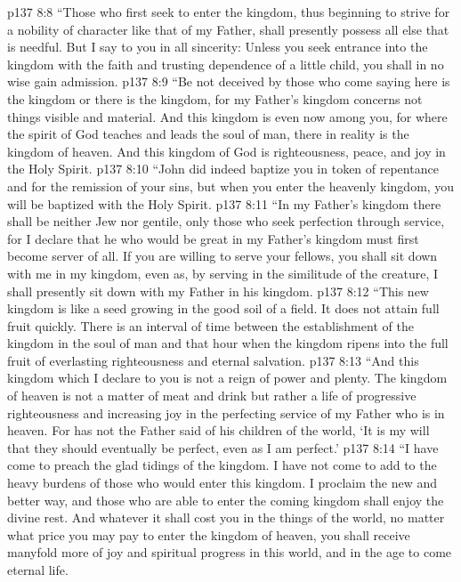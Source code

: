 \vs p137 8:8 \textcolor{ubdarkred}{“Those who first seek to enter the kingdom, thus beginning to strive for a nobility of character like that of my Father, shall presently possess all else that is needful. But I say to you in all sincerity: Unless you seek entrance into the kingdom with the faith and trusting dependence of a little child, you shall in no wise gain admission.}
\vs p137 8:9 \textcolor{ubdarkred}{“Be not deceived by those who come saying here is the kingdom or there is the kingdom, for my Father’s kingdom concerns not things visible and material. And this kingdom is even now among you, for where the spirit of God teaches and leads the soul of man, there in reality is the kingdom of heaven. And this kingdom of God is righteousness, peace, and joy in the Holy Spirit.}
\vs p137 8:10 \textcolor{ubdarkred}{“John did indeed baptize you in token of repentance and for the remission of your sins, but when you enter the heavenly kingdom, you will be baptized with the Holy Spirit.}
\vs p137 8:11 \textcolor{ubdarkred}{“In my Father’s kingdom there shall be neither Jew nor gentile, only those who seek perfection through service, for I declare that he who would be great in my Father’s kingdom must first become server of all. If you are willing to serve your fellows, you shall sit down with me in my kingdom, even as, by serving in the similitude of the creature, I shall presently sit down with my Father in his kingdom.}
\vs p137 8:12 \textcolor{ubdarkred}{“This new kingdom is like a seed growing in the good soil of a field. It does not attain full fruit quickly. There is an interval of time between the establishment of the kingdom in the soul of man and that hour when the kingdom ripens into the full fruit of everlasting righteousness and eternal salvation.}
\vs p137 8:13 \textcolor{ubdarkred}{“And this kingdom which I declare to you is not a reign of power and plenty. The kingdom of heaven is not a matter of meat and drink but rather a life of progressive righteousness and increasing joy in the perfecting service of my Father who is in heaven. For has not the Father said of his children of the world, ‘It is my will that they should eventually be perfect, even as I am perfect.’}
\vs p137 8:14 \textcolor{ubdarkred}{“I have come to preach the glad tidings of the kingdom. I have not come to add to the heavy burdens of those who would enter this kingdom. I proclaim the new and better way, and those who are able to enter the coming kingdom shall enjoy the divine rest. And whatever it shall cost you in the things of the world, no matter what price you may pay to enter the kingdom of heaven, you shall receive manyfold more of joy and spiritual progress in this world, and in the age to come eternal life.}
